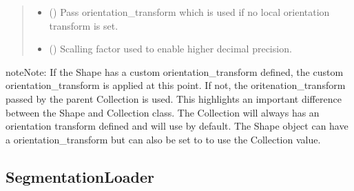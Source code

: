 \documentclass[a4paper,10pt,english,openany,oneside]{sphinxmanual}
\begin{document}
\begin{fulllineitems}
\begin{fulllineitems}
\begin{quote}
\begin{description}
\begin{itemize}
\item {} 
\sphinxAtStartPar
{} () \textendash{} Pass orientation\_transform which is used if no local orientation transform is set.

\item {} 
\sphinxAtStartPar
{} () \textendash{} Scalling factor used to enable higher decimal precision.

\end{itemize}

\end{description}\end{quote}

\begin{sphinxadmonition}{note}{Note:}
\sphinxAtStartPar
If the Shape has a custom orientation\_transform defined, the custom orientation\_transform is applied at this point. If not, the oritenation\_transform passed by the parent Collection is used. This highlights an important difference between the Shape and Collection class. The Collection will always has an orientation transform defined and will use  by default. The Shape object can have a orientation\_transform but can also be set to  to use the Collection value.
\end{sphinxadmonition}

\end{fulllineitems}


\end{fulllineitems}



\subsection{SegmentationLoader}
\label{\detokenize{pages/modules:segmentationloader}}
\end{document}

